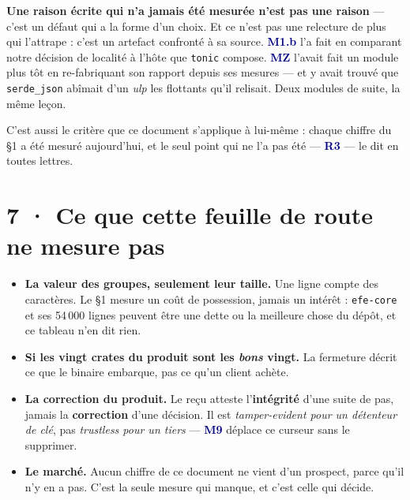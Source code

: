 \documentclass[10pt]{article}
\newcommand{\code}[1]{\texttt{\small #1}}
\newcommand{\mm}[1]{\textbf{\textcolor{navy}{#1}}}
\begin{document}
\begin{these}
\textbf{Une raison écrite qui n'a jamais été mesurée n'est pas une raison} --- c'est un défaut qui a
la forme d'un choix. Et ce n'est pas une relecture de plus qui l'attrape : c'est un artefact
confronté à sa source. \mm{M1.b} l'a fait en comparant notre décision de localité à l'hôte que
\code{tonic} compose. \mm{MZ} l'avait fait un module plus tôt en re-fabriquant son rapport depuis ses
mesures --- et y avait trouvé que \code{serde\_json} abîmait d'un \emph{ulp} les flottants qu'il
relisait. Deux modules de suite, la même leçon.

C'est aussi le critère que ce document s'applique à lui-même : chaque chiffre du §1 a été mesuré
aujourd'hui, et le seul point qui ne l'a pas été --- \mm{R3} --- le dit en toutes lettres.
\end{these}

\section{7 · Ce que cette feuille de route ne mesure pas}

\begin{itemize}[leftmargin=1.2em,itemsep=2.5pt,topsep=2pt]
\item \textbf{La valeur des groupes, seulement leur taille.} Une ligne compte des caractères. Le
      §1 mesure un coût de possession, jamais un intérêt : \code{efe-core} et ses 54\,000 lignes
      peuvent être une dette ou la meilleure chose du dépôt, et ce tableau n'en dit rien.
\item \textbf{Si les vingt crates du produit sont les \emph{bons} vingt.} La fermeture décrit ce que
      le binaire embarque, pas ce qu'un client achète.
\item \textbf{La correction du produit.} Le reçu atteste l'\textbf{intégrité} d'une suite de pas,
      jamais la \textbf{correction} d'une décision. Il est \emph{tamper-evident pour un détenteur de
      clé}, pas \emph{trustless pour un tiers} --- \mm{M9} déplace ce curseur sans le supprimer.
\item \textbf{Le marché.} Aucun chiffre de ce document ne vient d'un prospect, parce qu'il n'y en a
      pas. C'est la seule mesure qui manque, et c'est celle qui décide.
\end{itemize}
\end{document}
